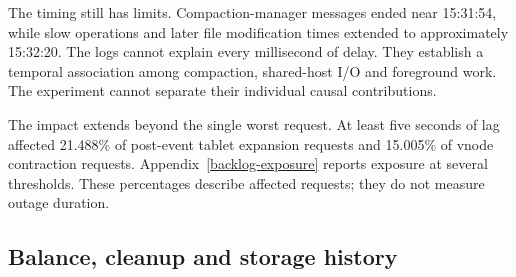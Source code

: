 The timing still has limits. Compaction-manager messages ended near 15:31:54, while slow operations and later file modification times extended to approximately 15:32:20. The logs cannot explain every millisecond of delay. They establish a temporal association among compaction, shared-host I/O and foreground work. The experiment cannot separate their individual causal contributions.

The impact extends beyond the single worst request. At least five seconds of lag affected 21.488\% of post-event tablet expansion requests and 15.005\% of vnode contraction requests. Appendix~\ref{backlog-exposure} reports exposure at several thresholds. These percentages describe affected requests; they do not measure outage duration.

\newpage

\hypertarget{balance-cleanup-and-storage-history}{%
\subsection{Balance, cleanup and storage
history}\label{balance-cleanup-and-storage-history}}

